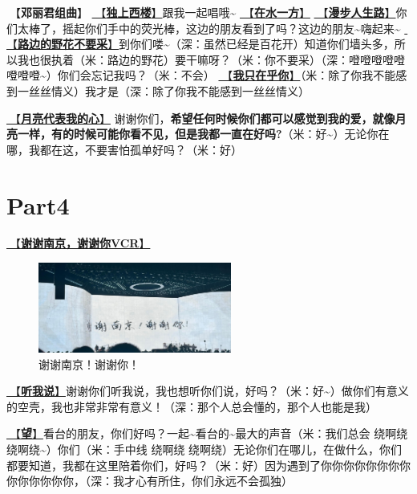 \documentclass[]{ctexbook}
\begin{document}
🎵【\textbf{邓丽君组曲}】
\hyperref[one-in-the-building]{🎵【\textbf{独上西楼}】}跟我一起唱哦\textasciitilde{}
\hyperref[on-the-water-side]{🎵【\textbf{在水一方}】}
\hyperref[walk-the-road-of-life]{🎵【\textbf{漫步人生路}】}你们太棒了，摇起你们手中的荧光棒，这边的朋友看到了吗？这边的朋友\textasciitilde 嗨起来\textasciitilde{}
\hyperref[only-with-me]{🎵【\textbf{路边的野花不要采}】}到你们喽\textasciitilde（深：虽然已经是百花开）知道你们墙头多，所以我也很执着（米：路边的野花）要干嘛呀？（米：你不要采）（深：噔噔噔噔噔噔噔噔\textasciitilde）你们会忘记我吗？（米：不会）
\hyperref[only-you]{🎵【\textbf{我只在乎你}】}（米：除了你我不能感到一丝丝情义）我才是（深：除了你我不能感到一丝丝情义）

\hyperref[my-heart-is-moon]{🎵【\textbf{月亮代表我的心}】} 谢谢你们，\textbf{希望任何时候你们都可以感觉到我的爱，就像月亮一样，有的时候可能你看不见，但是我都一直在好吗?}（米：好\textasciitilde）无论你在哪，我都在这，不要害怕孤单好吗？（米：好）

\section{Part4}\label{nanjing-20240811-part4}

\hyperref[thank-you-vcr]{🎥【\textbf{谢谢南京，谢谢你VCR}】}

\begin{figure}

{\centering \includegraphics[width=180pt]{img/nanjing20240811/thank-nanjing} 

}

\caption{谢谢南京！谢谢你！}\label{fig:unnamed-chunk-64}
\end{figure}

\hyperref[listen-to-me]{🎵【\textbf{听我说}】}谢谢你们听我说，我也想听你们说，好吗？（米：好\textasciitilde）做你们有意义的空壳，我也非常非常有意义！（深：那个人总会懂的，那个人也能是我）

\hyperref[hope]{🎵【\textbf{望}】}看台的朋友，你们好吗？一起\textasciitilde 看台的\textasciitilde 最大的声音（米：我们总会 绕啊绕 绕啊绕\textasciitilde）你们（米：手中线 绕啊绕 绕啊绕）无论你们在哪儿，在做什么，你们都要知道，我都在这里陪着你们，好吗？（米：好）因为遇到了你你你你你你你你你你你你你你，（深：我才心有所住，你们永远不会孤独）
\end{document}
